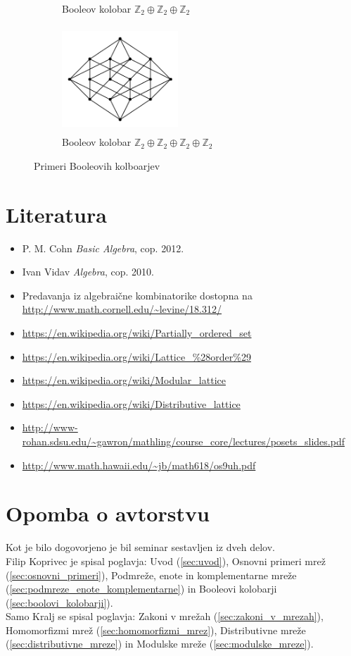\documentclass[a4paper]{article}
\begin{document}
\begin{figure}[h]
\begin{subfigure}[b]{0.5\textwidth}
\caption{Booleov kolobar $\mathbb{Z}_2 \oplus \mathbb{Z}_2 \oplus \mathbb{Z}_2$}
\end{subfigure}
\hfill
\begin{subfigure}[b]{0.5\textwidth}
\centering
\includegraphics[width=0.48\textwidth, height=4cm]{bool4}
\caption{Booleov kolobar $\mathbb{Z}_2 \oplus \mathbb{Z}_2 \oplus \mathbb{Z}_2 \oplus \mathbb{Z}_2$}
\end{subfigure}
\caption{Primeri Booleovih kolboarjev}
\label{im:boolean_ring_hasse_diagram}
\end{figure}

\pagebreak
\section{Literatura}
\begin{itemize}
\item P. M. Cohn {\em Basic Algebra},  cop. 2012.
\item Ivan Vidav {\em Algebra}, cop. 2010.
\item Predavanja iz algebraične kombinatorike dostopna na \url{http://www.math.cornell.edu/~levine/18.312/}
\item \url{https://en.wikipedia.org/wiki/Partially_ordered_set}
\item \url{https://en.wikipedia.org/wiki/Lattice_\%28order\%29}
\item \url{https://en.wikipedia.org/wiki/Modular_lattice}
\item \url{https://en.wikipedia.org/wiki/Distributive_lattice}
\item \url{http://www-rohan.sdsu.edu/~gawron/mathling/course_core/lectures/posets_slides.pdf}
\item \url{http://www.math.hawaii.edu/~jb/math618/os9uh.pdf}

\end{itemize}


\section*{Opomba o avtorstvu}
Kot je bilo dogovorjeno je bil seminar sestavljen iz dveh delov.\\
Filip Koprivec je spisal poglavja: Uvod (\ref{sec:uvod}), Osnovni primeri mrež (\ref{sec:osnovni_primeri}), Podmreže, enote in komplementarne mreže (\ref{sec:podmreze_enote_komplementarne}) in Booleovi kolobarji (\ref{sec:boolovi_kolobarji}).\\
Samo Kralj se spisal poglavja: Zakoni v mrežah (\ref{sec:zakoni_v_mrezah}), Homomorfizmi mrež (\ref{sec:homomorfizmi_mrez}), Distributivne mreže (\ref{sec:distributivne_mreze}) in Modulske mreže (\ref{sec:modulske_mreze}).
\end{document}
